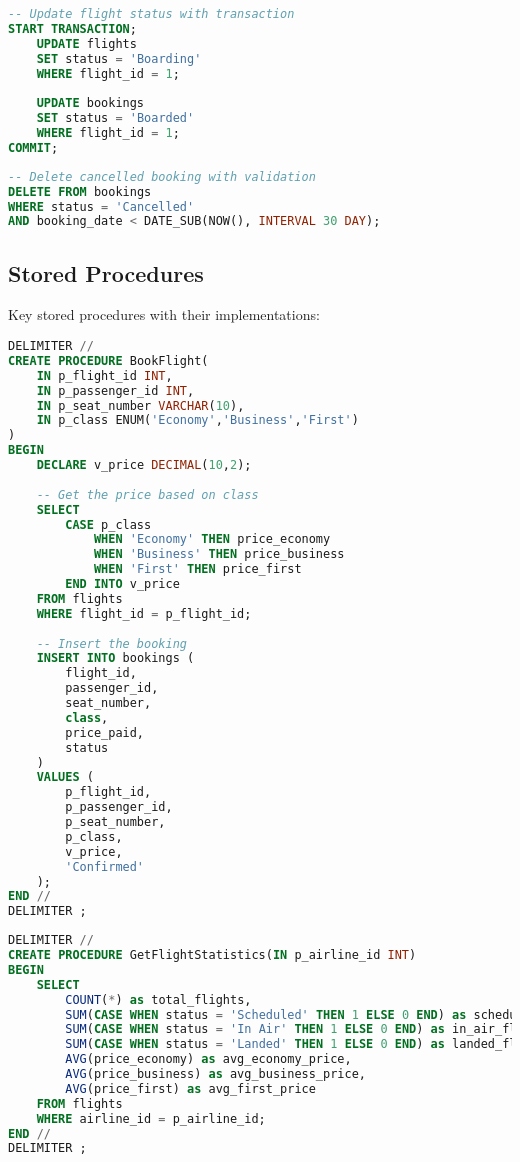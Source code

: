 \documentclass[a4paper,12pt]{article}
\begin{document}
\begin{lstlisting}[language=SQL, caption=Update Operation - Change Flight Status]
-- Update flight status with transaction
START TRANSACTION;
    UPDATE flights 
    SET status = 'Boarding' 
    WHERE flight_id = 1;
    
    UPDATE bookings 
    SET status = 'Boarded' 
    WHERE flight_id = 1;
COMMIT;
\end{lstlisting}

\begin{lstlisting}[language=SQL, caption=Delete Operation - Remove Cancelled Booking]
-- Delete cancelled booking with validation
DELETE FROM bookings 
WHERE status = 'Cancelled' 
AND booking_date < DATE_SUB(NOW(), INTERVAL 30 DAY);
\end{lstlisting}

\subsection{Stored Procedures}
Key stored procedures with their implementations:

\begin{lstlisting}[language=SQL, caption=BookFlight Stored Procedure]
DELIMITER //
CREATE PROCEDURE BookFlight(
    IN p_flight_id INT,
    IN p_passenger_id INT,
    IN p_seat_number VARCHAR(10),
    IN p_class ENUM('Economy','Business','First')
)
BEGIN
    DECLARE v_price DECIMAL(10,2);
    
    -- Get the price based on class
    SELECT 
        CASE p_class
            WHEN 'Economy' THEN price_economy
            WHEN 'Business' THEN price_business
            WHEN 'First' THEN price_first
        END INTO v_price
    FROM flights 
    WHERE flight_id = p_flight_id;
    
    -- Insert the booking
    INSERT INTO bookings (
        flight_id, 
        passenger_id, 
        seat_number, 
        class, 
        price_paid, 
        status
    )
    VALUES (
        p_flight_id, 
        p_passenger_id, 
        p_seat_number, 
        p_class, 
        v_price, 
        'Confirmed'
    );
END //
DELIMITER ;
\end{lstlisting}

\begin{lstlisting}[language=SQL, caption=GetFlightStatistics Stored Procedure]
DELIMITER //
CREATE PROCEDURE GetFlightStatistics(IN p_airline_id INT)
BEGIN
    SELECT 
        COUNT(*) as total_flights,
        SUM(CASE WHEN status = 'Scheduled' THEN 1 ELSE 0 END) as scheduled_flights,
        SUM(CASE WHEN status = 'In Air' THEN 1 ELSE 0 END) as in_air_flights,
        SUM(CASE WHEN status = 'Landed' THEN 1 ELSE 0 END) as landed_flights,
        AVG(price_economy) as avg_economy_price,
        AVG(price_business) as avg_business_price,
        AVG(price_first) as avg_first_price
    FROM flights
    WHERE airline_id = p_airline_id;
END //
DELIMITER ;
\end{lstlisting}
\end{document}
